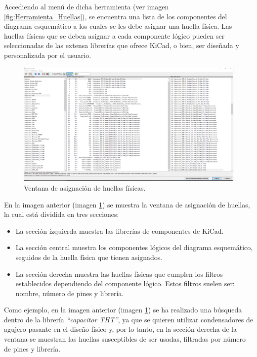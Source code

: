 Accediendo al menú de dicha herramienta (ver imagen \ref{fig:Herramienta_Huellas}), se encuentra una lista de los componentes del diagrama esquemático a los cuales se les debe asignar una huella física. Las huellas físicas que se deben asignar a cada componente lógico pueden ser seleccionadas de las extensa librerías que ofrece KiCad, o bien, ser diseñada y personalizada por el usuario.

\begin{figure}[H]
\centering 
\includegraphics[width=\linewidth]{pictures/AsignarHuellaTriple.PNG}
\caption{Ventana de asignación de huellas físicas.}
\label{fig:Asignar_Huella_Ventana}
\end{figure}

En la imagen anterior (imagen \ref{fig:Asignar_Huella_Ventana}) se muestra la ventana de asignación de huellas, la cual está dividida en tres secciones:
\begin{itemize}
    \item La sección izquierda muestra las librerías de componentes de KiCad.
    \item La sección central muestra los componentes lógicos del diagrama esquemático, seguidos de la huella física que tienen asignados.
    \item La sección derecha muestra las huellas físicas que cumplen los filtros establecidos dependiendo del componente lógico. Estos filtros suelen ser: nombre, número de pines y librería. 
\end{itemize}

Como ejemplo, en la imagen anterior (imagen \ref{fig:Asignar_Huella_Ventana}) se ha realizado una búsqueda dentro de la librería \textit{``capacitor \ac{THT}''}, ya que se quieren utilizar condensadores de agujero pasante en el diseño físico y, por lo tanto, en la sección derecha de la ventana se muestran las huellas susceptibles de ser usadas, filtradas por número de pines y librería.

